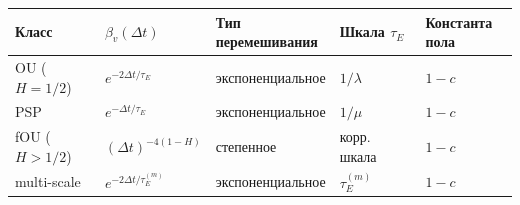 \documentclass[12pt]{iopart}
\begin{document}
{\def\LTcaptype{none} %

\begin{center}\small
\begin{tabular}{@{} >{\raggedright\arraybackslash}p{0.2000\linewidth} >{\raggedright\arraybackslash}p{0.2000\linewidth} >{\raggedright\arraybackslash}p{0.2000\linewidth} >{\raggedright\arraybackslash}p{0.2000\linewidth} >{\raggedright\arraybackslash}p{0.2000\linewidth}@{}}
\toprule

\begin{minipage}[b]{\linewidth}\raggedright

Класс

\end{minipage} & \begin{minipage}[b]{\linewidth}\raggedright

\(\beta_v(\Delta t)\)

\end{minipage} & \begin{minipage}[b]{\linewidth}\raggedright

Тип перемешивания

\end{minipage} & \begin{minipage}[b]{\linewidth}\raggedright

Шкала \(\tau_E\)

\end{minipage} & \begin{minipage}[b]{\linewidth}\raggedright

Константа пола

\end{minipage} \\

\midrule

\bottomrule

OU (\(H=1/2\)) & \(e^{-2\Delta t/\tau_E}\) & экспоненциальное & \(1/\lambda\) & \(1-c\) \\

PSP & \(e^{-\Delta t/\tau_E}\) & экспоненциальное & \(1/\mu\) & \(1-c\) \\

fOU (\(H>1/2\)) & \((\Delta t)^{-4(1-H)}\) & степенное & корр. шкала & \(1-c\) \\

multi-scale & \(e^{-2\Delta t/\tau_E^{(m)}}\) & экспоненциальное & \(\tau_E^{(m)}\) & \(1-c\) \\

\end{tabular}
\end{center}
}
\end{document}
